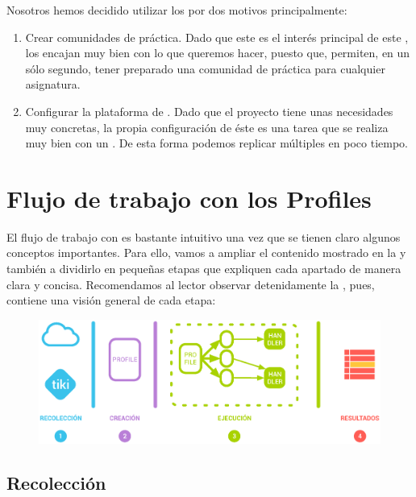 Nosotros hemos decidido utilizar los \profiles{} por dos motivos principalmente:

\begin{enumerate}
\item Crear comunidades de práctica. Dado que este es el interés principal de este \pfc{}, los \profiles{} encajan muy bien con lo que queremos hacer, puesto que, permiten, en un sólo segundo, tener preparado una comunidad de práctica para cualquier asignatura.

\item Configurar la plataforma de \alma{}. Dado que el proyecto tiene unas necesidades muy concretas, la propia configuración de éste es una tarea que se realiza muy bien con un \profile{}. De esta forma podemos replicar múltiples  en poco tiempo.
\end{enumerate}

\section{Flujo de trabajo con los Profiles}
\label{section:componentes-profiles}

El flujo de trabajo con \profiles{} es bastante intuitivo una vez que se tienen claro algunos conceptos importantes. Para ello, vamos a ampliar el contenido mostrado en la  y también a dividirlo en pequeñas etapas que expliquen cada apartado de manera clara y concisa. Recomendamos al lector observar detenidamente la , pues, contiene una visión general de cada etapa:

\begin{figure}[h!]
\centering
\includegraphics[width=\linewidth]{../graphics/fig_flujo_trabajo_profiles.eps}
\caption{}\label{fig:flujo_trabajo_profiles}
\end{figure}

\subsection{Recolección}


